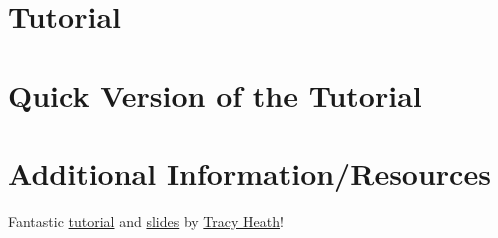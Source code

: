 \documentclass{article}
\begin{document}
\section{Tutorial}
\newcommand{\step}[2]{\addtocounter{stepCounter}{1} {\bf \hypertarget{step\arabic{stepCounter}}{Step \arabic{stepCounter}:}}\xspace #2\par}
\newcommand{\intermediate}[1]{#1}


\newpage
\section{Quick Version of the Tutorial}
\setcounter{stepCounter}{0}
\renewcommand{\step}[2]{\addtocounter{stepCounter}{1} {\bf \hyperlink{step\arabic{stepCounter}}{Step \arabic{stepCounter}}:}\xspace #1\par}
\renewcommand{\intermediate}[1]{}


\newpage
\section{Additional Information/Resources}
Fantastic
\href{http://treethinkers.org/divergence-time-estimation-using-beast/}{tutorial}
and
\href{https://molevol.mbl.edu/wiki/images/6/6f/Bodega_2013_divtime_lecture.pdf}{slides}
by \href{http://phylo.bio.ku.edu/content/tracy-heath}{Tracy Heath}!

\newpage

\end{document}
